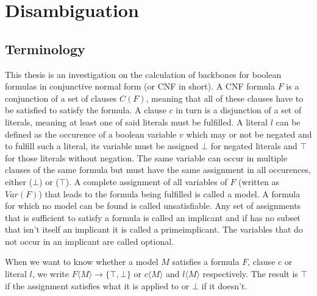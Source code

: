 \section{Disambiguation}
\subsection{Terminology}
This thesis is an investigation on the calculation of backbones for boolean formulas in conjunctive normal form (or CNF in short). A CNF formula $F$ is a conjunction of a set of clauses $C(F)$, meaning that all of these clauses have to be satisfied to satisfy the formula. A clause $c$ in turn is a disjunction of a set of literals, meaning at least one of said literals must be fulfilled. A literal $l$ can be defined as the occurence of a boolean variable $v$ which may or not be negated and to fulfill such a literal, its variable must be assigned $\bot$ for negated literals and $\top$ for those literals without negation. The same variable can occur in multiple clauses of the same formula but must have the same assignment in all occurences, either ($\bot$) or ($\top$). A complete assignment of all variables of $F$ (written as $Var(F)$) that leads to the formula being fulfilled is called a model. A formula for which no model can be found is called unsatisfiable. Any set of assignments that is sufficient to satisfy a formula is called an implicant and if has no subset that isn't itself an implicant it is called a primeimplicant. The variables that do not occur in an implicant are called optional.


When we want to know whether a model $M$ satisfies a formula $F$, clause $c$ or literal $l$, we write $F\langle M\rangle \rightarrow \{\top,\bot\}$ or $c\langle M\rangle$ and $l\langle M\rangle$ respectively. The result is $\top$ if the assignment satisfies what it is applied to or $\bot$ if it doesn't.

